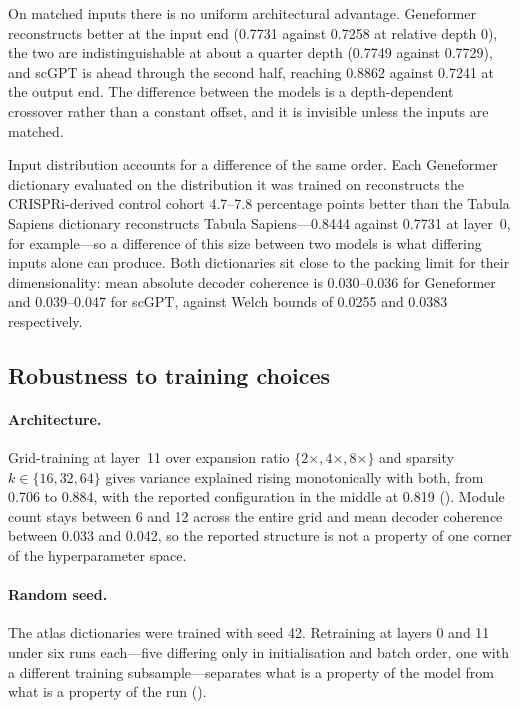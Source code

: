 \documentclass[onecolumn,11pt]{article}
\begin{document}
On matched inputs there is no uniform architectural advantage. Geneformer reconstructs better at
the input end (0.7731 against 0.7258 at relative depth 0), the two are indistinguishable at about a
quarter depth (0.7749 against 0.7729), and scGPT is ahead through the second half, reaching 0.8862
against 0.7241 at the output end. The difference between the models is a depth-dependent crossover
rather than a constant offset, and it is invisible unless the inputs are matched.

Input distribution accounts for a difference of the same order. Each Geneformer dictionary
evaluated on the distribution it was trained on reconstructs the CRISPRi-derived control cohort
4.7--7.8 percentage points better than the Tabula Sapiens dictionary reconstructs Tabula
Sapiens---0.8444 against 0.7731 at layer~0, for example---so a difference of this size between two
models is what differing inputs alone can produce. Both dictionaries sit close to the packing
limit for their dimensionality: mean absolute decoder coherence is 0.030--0.036 for Geneformer and
0.039--0.047 for scGPT, against Welch bounds of 0.0255 and 0.0383 respectively.

\subsection*{Robustness to training choices}
\label{sec:robustness}

\paragraph{Architecture.} Grid-training at layer~11 over expansion ratio $\{2\times, 4\times,
8\times\}$ and sparsity $k \in \{16, 32, 64\}$ gives variance explained rising monotonically with
both, from 0.706 to 0.884, with the reported configuration in the middle at 0.819
(). Module count stays between 6 and 12 across the entire grid and mean decoder
coherence between 0.033 and 0.042, so the reported structure is not a property of one corner of the
hyperparameter space.

\paragraph{Random seed.} The atlas dictionaries were trained with seed 42. Retraining at layers 0
and 11 under six runs each---five differing only in initialisation and batch order, one with a
different training subsample---separates what is a property of the model from what is a property of
the run ().
\end{document}
